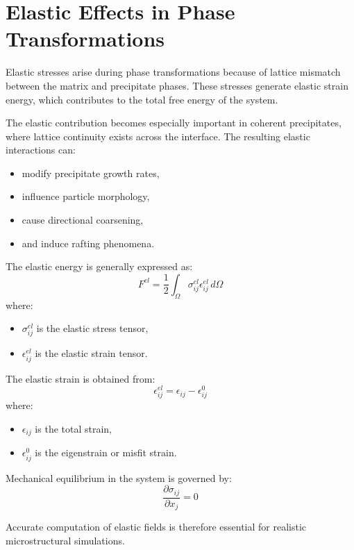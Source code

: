 \section{Elastic Effects in Phase Transformations}

Elastic stresses arise during phase transformations because of lattice mismatch between the matrix and precipitate phases. These stresses generate elastic strain energy, which contributes to the total free energy of the system.

The elastic contribution becomes especially important in coherent precipitates, where lattice continuity exists across the interface. The resulting elastic interactions can:
\begin{itemize}
    \item modify precipitate growth rates,
    \item influence particle morphology,
    \item cause directional coarsening,
    \item and induce rafting phenomena.
\end{itemize}

The elastic energy is generally expressed as:
\begin{equation}
F^{el}=\frac{1}{2}\int_{\Omega}\sigma_{ij}^{el}\epsilon_{ij}^{el}\,d\Omega
\end{equation}
where:
\begin{itemize}
    \item $\sigma_{ij}^{el}$ is the elastic stress tensor,
    \item $\epsilon_{ij}^{el}$ is the elastic strain tensor.
\end{itemize}

The elastic strain is obtained from:
\begin{equation}
\epsilon_{ij}^{el}=\epsilon_{ij}-\epsilon_{ij}^{0}
\end{equation}
where:
\begin{itemize}
    \item $\epsilon_{ij}$ is the total strain,
    \item $\epsilon_{ij}^{0}$ is the eigenstrain or misfit strain.
\end{itemize}

Mechanical equilibrium in the system is governed by:
\begin{equation}
\frac{\partial \sigma_{ij}}{\partial x_j}=0
\end{equation}

Accurate computation of elastic fields is therefore essential for realistic microstructural simulations.

